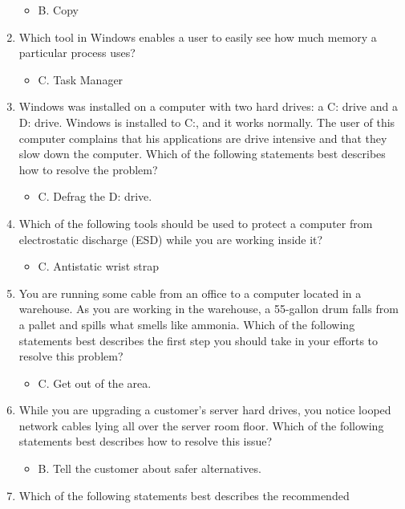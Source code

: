 \documentclass{article}
\begin{document}
\begin{enumerate}
    \begin{itemize}
        \item B. Copy
    \end{itemize}
    \item Which tool in Windows enables a user to easily see how much
memory a particular process uses?
    \begin{itemize}
        \item C. Task Manager
    \end{itemize}
    \item Windows was installed on a computer with two hard drives: a C:
drive and a D: drive. Windows is installed to C:, and it works normally.
The user of this computer complains that his applications are
drive intensive and that they slow down the computer. Which of the
following statements best describes how to resolve the problem?
    \begin{itemize}
        \item C. Defrag the D: drive.
    \end{itemize}
    \item Which of the following tools should be used to protect a computer
from electrostatic discharge (ESD) while you are working inside it?
    \begin{itemize}
        \item C. Antistatic wrist strap
    \end{itemize}
    \item You are running some cable from an office to a computer located
in a warehouse. As you are working in the warehouse, a 55-gallon
drum falls from a pallet and spills what smells like ammonia.
Which of the following statements best describes the first step you
should take in your efforts to resolve this problem?
    \begin{itemize}
        \item C. Get out of the area.
    \end{itemize}
    \item While you are upgrading a customer’s server hard drives, you notice
looped network cables lying all over the server room floor. Which of
the following statements best describes how to resolve this issue?
    \begin{itemize}
        \item B. Tell the customer about safer alternatives.
    \end{itemize}
    \item Which of the following statements best describes the recommended

\end{enumerate}
\end{document}
